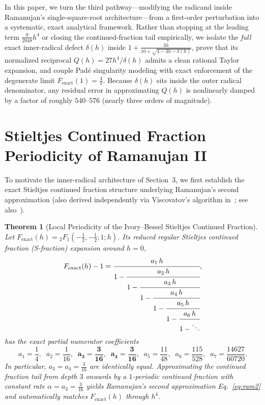 \documentclass[11pt,a4paper]{article}
\theoremstyle{spacious}
\newtheorem{theorem}{Theorem}[section]
\theoremstyle{spaciousdef}
\begin{document}
In this paper, we turn the third pathway---modifying the radicand inside Ramanujan's single-square-root architecture---from a first-order perturbation into a systematic, exact analytical framework. Rather than stopping at the leading term $\tfrac{9}{2048}h^4$ or closing the continued-fraction tail empirically, we isolate the \emph{full} exact inner-radical defect $\delta(h)$ inside $1 + \tfrac{3h}{10 + \sqrt{4 - 3h - \delta(h)}}$, prove that its normalized reciprocal $Q(h) = 27h^4/\delta(h)$ admits a clean rational Taylor expansion, and couple Pad\'e singularity modeling with exact enforcement of the degenerate limit $F_{\text{exact}}(1) = \tfrac{4}{\pi}$. Because $\delta(h)$ sits inside the outer radical denominator, any residual error in approximating $Q(h)$ is nonlinearly damped by a factor of roughly $540$--$576$ (nearly three orders of magnitude).

\section{Stieltjes Continued Fraction Periodicity of Ramanujan II}

To motivate the inner-radical architecture of Section~3, we first establish the exact Stieltjes continued fraction structure underlying Ramanujan's second approximation (also derived independently via Viscovatov's algorithm in~\cite{Shankar2026}; see also~\cite{JacobsenWaadeland1985,LorentzenWaadeland1992}).

\begin{theorem}[Local Periodicity of the Ivory--Bessel Stieltjes Continued Fraction]\label{thm:cf_periodicity}
Let $F_{\text{exact}}(h) = {}_2F_1\!\left(-\tfrac{1}{2}, -\tfrac{1}{2}; 1; h\right)$. Its reduced regular Stieltjes continued fraction (S-fraction) expansion around $h = 0$,
\begin{equation}\label{eq:s_fraction}
F_{\text{exact}}(h) - 1 = \cfrac{a_1\,h}{1 - \cfrac{a_2\,h}{1 - \cfrac{a_3\,h}{1 - \cfrac{a_4\,h}{1 - \cfrac{a_5\,h}{1 - \cfrac{a_6\,h}{1 - \ddots}}}}}},
\end{equation}
has the exact partial numerator coefficients
\begin{equation}\label{eq:cf_coeffs}
a_1 = \frac{1}{4},\;\; a_2 = \frac{1}{16},\;\; \mathbf{a_3 = \frac{3}{16}},\;\; \mathbf{a_4 = \frac{3}{16}},\;\; a_5 = \frac{11}{48},\;\; a_6 = \frac{115}{528},\;\; a_7 = \frac{14627}{60720}.
\end{equation}
In particular, $a_3 = a_4 = \frac{3}{16}$ are identically equal. Approximating the continued fraction tail from depth $3$ onwards by a $1$-periodic continued fraction with constant rate $\alpha = a_3 = \frac{3}{16}$ yields Ramanujan's second approximation Eq.~\eqref{eq:ram2} and automatically matches $F_{\text{exact}}(h)$ through $h^4$.
\end{theorem}
\end{document}
